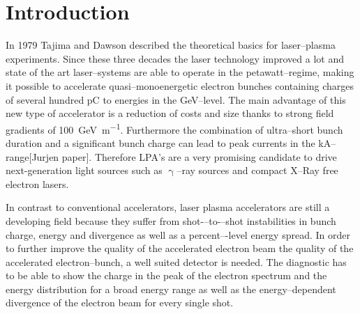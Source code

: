 \documentclass[%
reprint,
amsmath,
amssymb,
aip,
rsi, 
numerical,
floatfix,
]{revtex4-1}
\newcommand{\myCite}[1]{\textcolor{blue}{\cite{#1}}}
\begin{document}
\maketitle



\section{\label{Mot} Introduction}

In 1979 Tajima and Dawson described the theoretical basics for laser--plasma experiments\myCite{Tajima1979}.
Since these three decades the laser technology improved a lot and state of the art laser--systems are able to operate in the petawatt--regime\myCite{Gaul2010}, making it possible to accelerate quasi--monoenergetic\myCite{Geddes2004, Faure2004, Mangles2004} electron bunches containing charges of several hundred \si{\pico\coulomb} to energies in the \si{\giga\electronvolt}--level\myCite{Leemans2014, Schroeder2007, Wang2013}.
The main advantage of this new type of accelerator is a reduction of costs and size thanks to strong field gradients of \SI[per-mode=symbol]{100}{\giga\electronvolt\per\metre}\myCite{Esarey2009,Hooker2013}. 
Furthermore the combination of ultra--short bunch duration and a significant bunch charge can lead to peak currents in the \si{\kilo\ampere}--range[Jurjen paper]. 
Therefore LPA's are a very promising candidate to drive next-generation light sources such as $\upgamma$--ray sources\myCite{Sarri2014, TaPhuoc2012} and compact X--Ray free electron lasers\myCite{Schlenvoigt2008, Fuchs2009, Albert2014}.

In contrast to conventional accelerators, laser plasma accelerators are still a developing field because they suffer from shot-–to-–shot
instabilities in bunch charge, energy and divergence as well as a percent–-level energy spread. 
In order to further improve the quality of the accelerated electron beam  the quality of the accelerated electron--bunch, a well suited detector is needed. 
The diagnostic has to be able to show the charge in the peak of the electron spectrum and the energy distribution for a broad energy range as well as the energy--dependent divergence of the electron beam for every single shot. 
\end{document}
